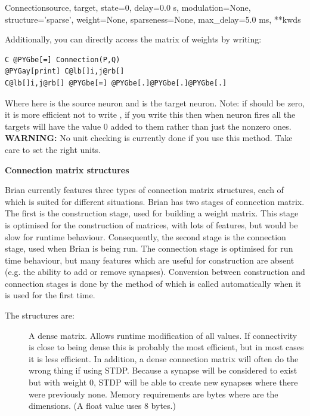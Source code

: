\documentclass[letterpaper,10pt,english]{manual}
\begin{document}
\begin{classdesc}{Connection}{source, target, state=0, delay=0.0 s, modulation=None, structure='sparse', weight=None, sparseness=None, max\_delay=5.0 ms, **kwds}
\begin{description}
\end{description}

Additionally, you can directly access the matrix of weights by writing:

\begin{Verbatim}[commandchars=@\[\]]
C @PYGbe[=] Connection(P,Q)
@PYGay[print] C@lb[]i,j@rb[]
C@lb[]i,j@rb[] @PYGbe[=] @PYGbe[.]@PYGbe[.]@PYGbe[.]
\end{Verbatim}

Where here  is the source neuron and  is the target neuron.
Note: if  should be zero, it is more efficient not to write
, if you write this then when neuron  fires all the
targets will have the value 0 added to them rather than just the
nonzero ones.
\textbf{WARNING:} No unit checking is currently done if you use this method.
Take care to set the right units.

\textbf{Connection matrix structures}

Brian currently features three types of connection matrix structures,
each of which is suited for different situations. Brian has two stages
of connection matrix. The first is the construction stage, used for
building a weight matrix. This stage is optimised for the construction
of matrices, with lots of features, but would be slow for runtime
behaviour. Consequently, the second stage is the connection stage,
used when Brian is being run. The connection stage is optimised for
run time behaviour, but many features which are useful for construction
are absent (e.g. the ability to add or remove synapses). Conversion
between construction and connection stages is done by the
 method of \hyperlink{brian.Connection}{} which is called
automatically when it is used for the first time.

The structures are:
\begin{description}
\item[]
A dense matrix. Allows runtime modification of all values. If
connectivity is close to being dense this is probably the most
efficient, but in most cases it is less efficient. In addition,
a dense connection matrix will often do the wrong thing if
using STDP. Because a synapse will be considered to exist but
with weight 0, STDP will be able to create new synapses where
there were previously none. Memory requirements are 
bytes where  are the dimensions. (A  float
value uses 8 bytes.)


\end{description}
\end{classdesc}
\end{document}
